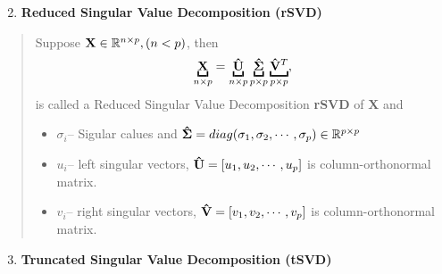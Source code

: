 \documentclass[letterpaper,11pt,english]{sphinxmanual}
\def\bX{\mathbf{X}}
\begin{document}
\begin{enumerate}
\setcounter{enumi}{1}
\item {} 
\textbf{Reduced Singular Value Decomposition (rSVD)}

\end{enumerate}
\begin{quote}

Suppose \({\bf X}\in\mathbb{R}^{n\times p},(n<p)\), then
\label{dim:equation-rsvd}\begin{gather}
\begin{split}    \underbracket{\bf X}_{n\times p} =\underbracket{\bf \hat{U}}_{n\times p} \underbracket{\bf\hat{\Sigma}}_{p\times p} \underbracket{{\bf \hat{V}}^T}_{p\times p},\end{split}\label{dim-rsvd}
\end{gather}
is called a Reduced Singular Value Decomposition \textbf{rSVD} of \({\bX}\) and
\begin{itemize}
\item {} 
\(\sigma_i\)-- Sigular calues and \({\bf\hat{\Sigma}}=diag(\sigma_1,\sigma_2, \cdots, \sigma_p)\in \mathbb{R}^{p\times p}\)

\item {} 
\(u_i\)-- left singular vectors, \({\bf \hat{U}}=[u_1,u_2, \cdots, u_p]\) is column-orthonormal matrix.

\item {} 
\(v_i\)-- right singular vectors, \({\bf \hat{V}}=[v_1,v_2, \cdots, v_p]\) is column-orthonormal matrix.

\end{itemize}
\end{quote}
\begin{enumerate}
\setcounter{enumi}{2}
\item {} 
\textbf{Truncated Singular Value Decomposition (tSVD)}

\end{enumerate}
\end{document}
